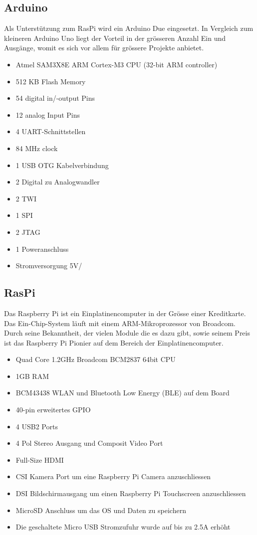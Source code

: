 \documentclass[a4paper]{report}
\begin{document}
\subsection{Arduino}

Als Unterstützung zum RasPi wird ein Arduino Due eingesetzt. In Vergleich zum kleineren Arduino Uno liegt der Vorteil in der grösseren Anzahl Ein und Ausgänge, womit es sich vor allem für grössere Projekte anbietet.



\begin{itemize}[noitemsep]
	\item Atmel SAM3X8E ARM Cortex-M3 CPU (32-bit ARM controller)
	\item 512 KB Flash Memory
	\item 54 digital in/-output Pins
	\item 12 analog Input Pins
	\item 4 UART-Schnittstellen
	\item 84 MHz clock
	\item 1 USB OTG Kabelverbindung
	\item 2 Digital zu Analogwandler
	\item 2 TWI
	\item 1 SPI
	\item 2 JTAG
	\item 1 Poweranschluss
	\item Stromversorgung 5V/
\end{itemize}\parencite{ArduinoDue2018}

\subsection{RasPi}
Das Raspberry Pi ist ein Einplatinencomputer in der Grösse einer Kreditkarte. Das Ein-Chip-System läuft mit einem ARM-Mikroprozessor von Broadcom. Durch seine Bekanntheit, der vielen Module die es dazu gibt, sowie seinem Preis ist das Raspberry Pi Pionier auf dem Bereich der Einplatinencomputer.

\begin{itemize}[noitemsep]
	\item Quad Core 1.2GHz Broadcom BCM2837 64bit CPU
	\item 1GB RAM
	\item BCM43438 WLAN und Bluetooth Low Energy (BLE) auf dem Board
	\item 40-pin erweitertes GPIO
	\item 4 USB2 Ports
	\item 4 Pol Stereo Ausgang und Composit Video Port
	\item Full-Size HDMI
	\item CSI Kamera Port um eine Raspberry Pi Camera anzuschliessen
	\item DSI Bildschirmausgang um einen Raspberry Pi Touchscreen anzuschliessen
	\item MicroSD Anschluss um das OS und Daten zu speichern
	\item Die geschaltete Micro USB Stromzufuhr wurde auf bis zu 2.5A erhöht
\end{itemize}\parencite{RaspberryPiFoundation2017}
\end{document}
